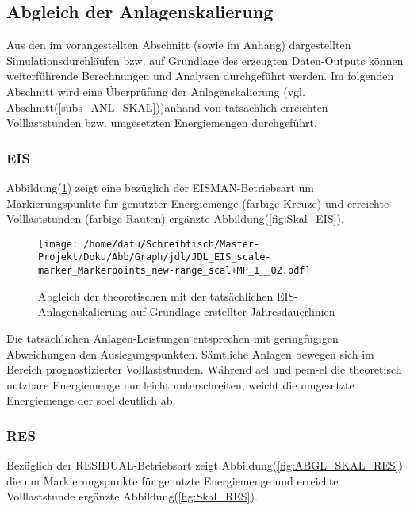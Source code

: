 \documentclass[onecolumn,10pt,titlepage]{article}
\begin{document}
\newpage
\subsection{Abgleich der Anlagenskalierung}
Aus den im vorangestellten Abschnitt (sowie im Anhang) dargestellten Simulationsdurchläufen bzw. auf Grundlage des erzeugten Daten-Outputs können weiterführende Berechnungen und Analysen durchgeführt werden. Im folgenden Abschnitt wird eine Überprüfung der Anlagenskalierung (vgl. Abschnitt(\ref{subs_ANL_SKAL}))anhand von tatsächlich erreichten Volllaststunden bzw. umgesetzten Energiemengen durchgeführt.

\subsubsection{EIS}
Abbildung(\ref{fig:ABGL_SKAL_EIS}) zeigt eine bezüglich der EISMAN-Betriebsart um Markierungspunkte für genutzter Energiemenge (farbige Kreuze) und erreichte Volllaststunden (farbige Rauten) ergänzte Abbildung(\ref{fig:Skal_EIS}).
\begin{figure}[H]

	\centering
	\texttt{[image: /home/dafu/Schreibtisch/Master-Projekt/Doku/Abb/Graph/jdl/JDL\_EIS\_scale-marker\_Markerpoints\_new-range\_scal+MP\_1\_\_02.pdf]}
	\caption[Abgleich Anlagenskalierung -EIS]{Abgleich der theoretischen mit der tatsächlichen EIS-Anlagenskalierung auf Grundlage erstellter Jahresdauerlinien}
	\label{fig:ABGL_SKAL_EIS}
\end{figure}
Die tatsächlichen Anlagen-Leistungen entsprechen mit geringfügigen Abweichungen den Auslegungspunkten. Sämtliche Anlagen bewegen sich im Bereich prognostizierter Volllaststunden. Während \gls{ael} und \gls{pem}-\gls{el} die theoretisch nutzbare Energiemenge nur leicht unterschreiten, weicht die umgesetzte Energiemenge der \gls{soel} deutlich ab.
\newpage
\subsubsection{RES}
Bezüglich der RESIDUAL-Betriebsart zeigt Abbildung(\ref{fig:ABGL_SKAL_RES}) die um Markierungspunkte für genutzte Energiemenge und erreichte Volllaststunde ergänzte Abbildung(\ref{fig:Skal_RES}).\\
\end{document}
